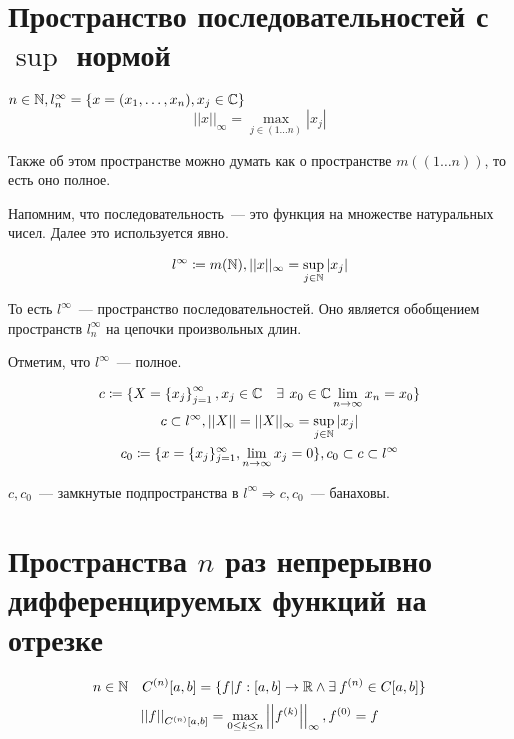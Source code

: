 \documentclass[document]{subfiles}
\begin{document}
\section{Пространство последовательностей с $\sup$ нормой}

\begin{definition}
    $n \in \mathbb{N}, l^\infty_n = \{ x = (x_1, \ldots, x_n), x_j \in \mathbb{C} \}$
    \[ ||x||_\infty = \max_{j \in (1\ldots n)} |x_j| \]
\end{definition}

Также об этом пространстве можно думать как о пространстве $m((1\ldots n))$, то есть оно полное.

Напомним, что последовательность~--- это функция на множестве натуральных чисел. Далее это используется явно.

\begin{definition}[$l^\infty$]
    \begin{gather*}
        l^\infty \coloneqq m(\mathbb{N}), ||x||_\infty = \sup_{j \in \mathbb{N}} |x_j|
    \end{gather*}    
\end{definition}

То есть $l^\infty$~--- пространство последовательностей. Оно является обобщением пространств $l^\infty_n$ на цепочки произвольных длин.

Отметим, что $l^\infty$~--- полное.

\begin{definition}
    \begin{gather*}
        c \coloneqq \{ X = \seq{x_j}^\infty_{j=1}, x_j \in \bC \quad \exists \, x_0 \in \bC  \liml_{n \to \infty}{x_n = x_0} \} \\
        c \subset l^\infty, ||X|| = ||X||_\infty = \sup_{j \in \bN} |x_j| \\
        c_0 \coloneqq \{x=\{x_j\}_{j=1}^\infty, \liml_{n \to \infty} x_j = 0\}, c_0 \subset c \subset l^\infty 
    \end{gather*}
\end{definition}

$c, c_0$~--- замкнутые подпространства в $l^\infty \Rightarrow c, c_0$~--- банаховы. 

 \section{Пространства $n$ раз непрерывно дифференцируемых функций на отрезке}

 \begin{definition}
    \[n \in \bN \quad C^{(n)}[a,b] = \{ f | f: [a, b] \rightarrow \bR \land \exists f^{(n)} \in C[a,b] \} \]
    \[ \left|\left| {f} \right| \right|_{C^{(n)}[a,b]} = \max_{0 \leq k \leq n} \left|\left| {f^{(k)}} \right| \right|_\infty, f^{(0)} = f \]
 \end{definition}
\end{document}
